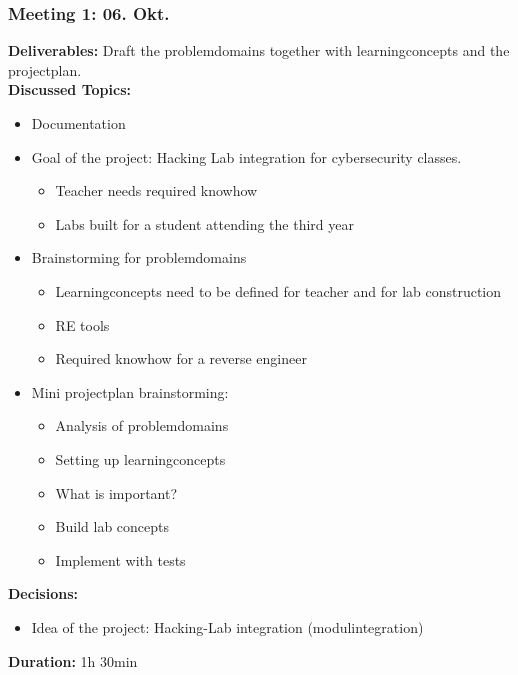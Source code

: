\subsubsection*{Meeting 1: 06. Okt.}
\textbf{Deliverables:} Draft the problemdomains together with learningconcepts and the projectplan. \\
\textbf{Discussed Topics:} 
\begin{itemize}
    \item Documentation
    \item Goal of the project: Hacking Lab integration for cybersecurity classes.
    \begin{itemize}
        \item Teacher needs required knowhow
        \item Labs built for a student attending the third year
    \end{itemize}
    \item Brainstorming for problemdomains
    \begin{itemize}
        \item Learningconcepts need to be defined for teacher and for lab construction
        \item RE tools
        \item Required knowhow for a reverse engineer
    \end{itemize}
    \item Mini projectplan brainstorming:
    \begin{itemize}
        \item Analysis of problemdomains
        \item Setting up learningconcepts
        \item What is important?
        \item Build lab concepts
        \item Implement with tests
    \end{itemize}
\end{itemize}
\textbf{Decisions:} 
\begin{itemize}
    \item Idea of the project: Hacking-Lab integration (modulintegration)
\end{itemize}
\textbf{Duration:} 1h 30min

\newpage
